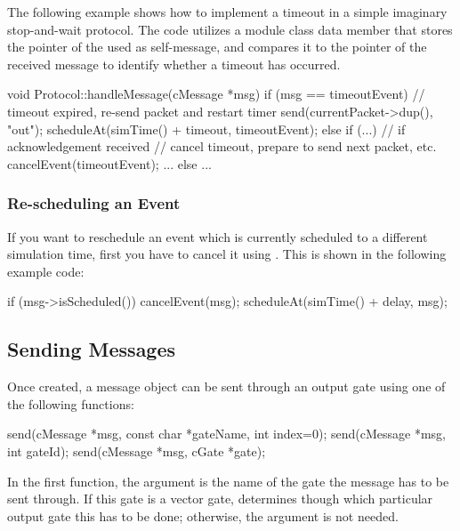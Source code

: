 The following example shows how to implement a timeout in a simple
imaginary stop-and-wait protocol. The code utilizes a 
module class data member that stores the pointer of the  used
as self-message, and compares it to the pointer of the received message
to identify whether a timeout has occurred.

\begin{cpp}
void Protocol::handleMessage(cMessage *msg)
{
    if (msg == timeoutEvent) {
        // timeout expired, re-send packet and restart timer
        send(currentPacket->dup(), "out");
        scheduleAt(simTime() + timeout, timeoutEvent);
    }
    else if (...) {  // if acknowledgement received
        // cancel timeout, prepare to send next packet, etc.
        cancelEvent(timeoutEvent);
        ...
    }
    else {
       ...
    }
}
\end{cpp}


\subsubsection{Re-scheduling an Event}

If you want to reschedule an event which is currently scheduled to a different
simulation time, first you have to cancel it using .
This is shown in the following example code:

\begin{cpp}
if (msg->isScheduled())
    cancelEvent(msg);
scheduleAt(simTime() + delay, msg);
\end{cpp}


\subsection{Sending Messages}

Once created, a message object can be sent through an
output gate using one of the following functions:

\begin{cpp}
send(cMessage *msg, const char *gateName, int index=0);
send(cMessage *msg, int gateId);
send(cMessage *msg, cGate *gate);
\end{cpp}

In the first function, the argument  is the name of
the gate the message has to be sent through. If this gate is
a vector gate,  determines though which particular output
gate this has to be done; otherwise, the  argument is not
needed.

